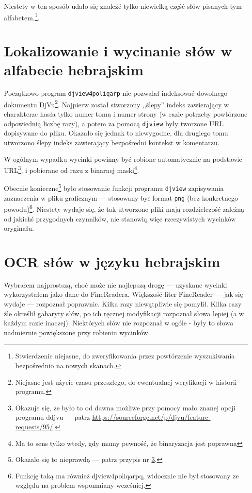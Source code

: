 \documentclass[12]{mwart}
\begin{document}
Niestety w ten sposób udało się znaleźć tylko niewielką część słów
pisanych tym alfabetem.\footnote{Stwierdzenie niejasne, do
  zweryfikowania przez powtórzenie wyszukiwania bezpośrednio na nowych
  skanach.}.

\section{Lokalizowanie i wycinanie słów w alfabecie hebrajskim}
\label{sec:lokal-i-wycin}

Początkowo program \texttt{djview4poliqarp} nie pozwalał indeksować
dowolnego dokumentu DjVu\footnote{Niejasne jest użycie czasu
  przeszłego, do ewentualnej weryfikacji w historii
  programu.}. Najpierw został stworzony ,,ślepy'' indeks zawierający w
charakterze hasła tylko numer tomu i numer strony (w razie potrzeby
powtórzone odpowiednią liczbę razy), a potem za pomocą \texttt{djview}
były tworzone URL dopisywane do pliku. Okazało się jednak to
niewygodne, dla drugiego tomu utworzono ślepy indeks zawierający
bezpośredni kontekst w komentarzu.

W ogólnym wypadku wycinki powinny być robione automatycznie na
podstawie URL\footnote{\label{przypis}Okazuje się, że było to od dawna
  możliwe przy pomocy mało znanej opcji programu \textsf{ddjvu} ---
  patrz \url{https://sourceforge.net/p/djvu/feature-requests/95/}.}, i
pobierane od razu z binarnej maski\footnote{Ma to sens tylko wtedy,
  gdy mamy pewność, że binaryzacja jest poprawna}.

Obecnie konieczne\footnote{Okazalo się to nieprawdą --- patrz przypis
  nr \ref{przypis}.} było stosowanie funkcji programu \texttt{djview}
zapisywania zaznaczenia w pliku graficznym --- stosowany był format
\texttt{png} (bez konkretnego powodu)\footnote{Funkcję taką ma również
  \textsf{djview4poliqarpq}, widocznie nie był stosowany ze względu na
  problem wspomniany wcześniej.}. Niestety wydaje się, że tak
utworzone pliki mają rozdzielczość zależną od jakichś przygodnych
czynników, nie stanowią więc rzeczywistych wycinków oryginału.

\section{OCR słów w języku hebrajskim}
\label{sec:ocr-sow-w}

Wybrałem najprostszą, choć może nie najlepszą drogę --- uzyskane
wycinki wykorzystałem jako dane do FineReadera. Większość liter
FineReader --- jak się wydaje --- rozpoznał poprawnie. Kilka razy
niewątpliwie się pomylił. Kilka razy źle określił gabaryty słów, po
ich ręcznej modyfikacji rozpoznał słowa lepiej (a w każdym razie
inaczej). Niektórych słów nie rozpoznał w ogóle - były to słowa
nadmiernie powiększone przy robieniu wycinków.
\end{document}
